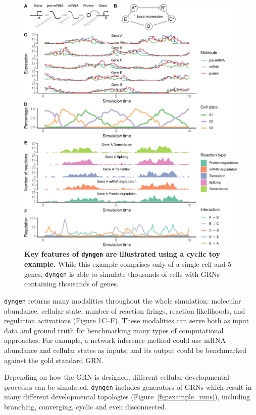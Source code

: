 \begin{figure}[htb!]
	\centering
	\includegraphics[width=\linewidth]{fig/simplecyclic_edited} 
	\caption{
		\textbf{Key features of \texttt{dyngen} are illustrated using a cyclic toy example.}
		While this example comprises only of a single cell and 5 genes, \texttt{dyngen} is able to simulate thousands of cells with GRNs containing thousands of genes.
	}
	\label{fig:simplecyclic}
\end{figure}

\texttt{dyngen} returns many modalities throughout the whole simulation: molecular abundance, cellular state, number of reaction firings, reaction likelihoods, and regulation activations (Figure \ref{fig:simplecyclic}C--F). These modalities can serve both as input data and ground truth for benchmarking many types of computational approaches. For example, a network inference method could use mRNA abundance and cellular states as inputs, and its output could be benchmarked against the gold standard GRN.

Depending on how the GRN is designed, different cellular developmental processes can be simulated.
\texttt{dyngen} includes generators of GRNs which result in many different developmental topologies (Figure~\ref{fig:example_runs}), including branching, converging, cyclic and even disconnected.

